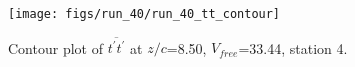 \begin{figure}[H]
\centering
\texttt{[image: figs/run\_40/run\_40\_tt\_contour]}
\caption{Contour plot of $\overline{t^\prime t^\prime}$ at $z/c$=8.50, $V_{free}$=33.44, station 4.}
\label{fig:run_40_tt_contour}
\end{figure}


